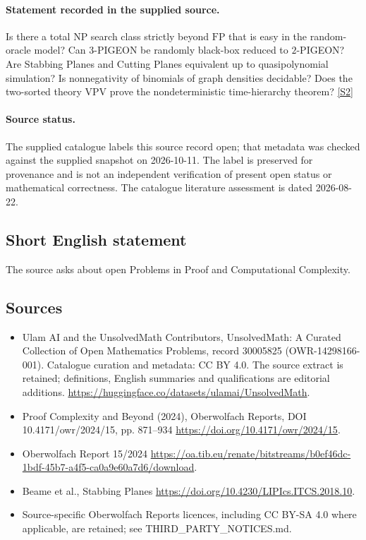 \documentclass[11pt]{article}
\begin{document}
\paragraph{Statement recorded in the supplied source.}
Is there a total NP search class strictly beyond $\mathrm{FP}$ that is easy in the random-oracle model? Can $3$-PIGEON be randomly black-box reduced to $2$-PIGEON? Are Stabbing Planes and Cutting Planes equivalent up to quasipolynomial simulation? Is nonnegativity of binomials of graph densities decidable? Does the two-sorted theory $\mathrm{VPV}$ prove the nondeterministic time-hierarchy theorem? \href{https://doi.org/10.4171/owr/2024/15}{[S2]}
\paragraph{Source status.}
The supplied catalogue labels this source record open; that metadata was checked against the supplied snapshot on 2026-10-11. The label is preserved for provenance and is not an independent verification of present open status or mathematical correctness. The catalogue literature assessment is dated 2026-08-22.
\subsection{Short English statement}
The source asks about open Problems in Proof and Computational Complexity.
\subsection{Sources}
\begin{itemize}
\item[S1] Ulam AI and the UnsolvedMath Contributors, UnsolvedMath: A Curated Collection of Open Mathematics Problems, record 30005825 (OWR-14298166-001). Catalogue curation and metadata: CC BY 4.0. The source extract is retained; definitions, English summaries and qualifications are editorial additions.
\url{https://huggingface.co/datasets/ulamai/UnsolvedMath}.
\item[S2] Proof Complexity and Beyond (2024), Oberwolfach Reports, DOI 10.4171/owr/2024/15, pp. 871--934
\url{https://doi.org/10.4171/owr/2024/15}.
\item[S3] Oberwolfach Report 15/2024
\url{https://oa.tib.eu/renate/bitstreams/b0ef46dc-1bdf-45b7-a4f5-ca0a9e60a7d6/download}.
\item[S4] Beame et al., Stabbing Planes
\url{https://doi.org/10.4230/LIPIcs.ITCS.2018.10}.
\item Source-specific Oberwolfach Reports licences, including CC BY-SA 4.0 where applicable, are retained; see THIRD\_PARTY\_NOTICES.md.
\end{itemize}
\end{document}
